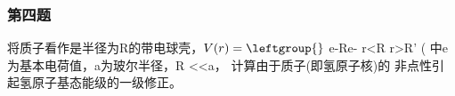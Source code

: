 \subsubsection{第四题}
将质子看作是半径为R的带电球壳，$V(r)=\leftgroup{}$
e-Re-
r<R
r>R'
(
中e为基本电荷值，a为玻尔半径，R <<a， 计算由于质子(即氢原子核)的
非点性引起氢原子基态能级的一级修正。

